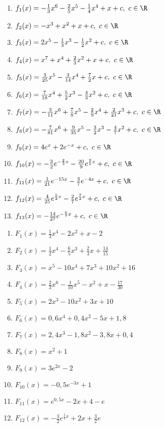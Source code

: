 \begin{Answer}[ref=stammfunktionenA2]
	\begin{enumerate}[label=\alph*)]
		\item \(f_1(x)=-\frac{1}{3}x^6-\frac{2}{5}x^5-\frac{1}{4}x^4+x+c,\ c\in\R\)
		\item \(f_2(x)=-x^3+x^2+x+c,\ c\in\R\)
		\item \(f_3(x)=2x^5-\frac{1}{3}x^3-\frac{1}{2}x^2+c,\ c\in\R\)
		\item \(f_4(x)=x^7+x^4+\frac{2}{3}x^2+x+c,\ c\in\R\)
		\item \(f_5(x)=\frac{3}{25}x^5-\frac{3}{14}x^4+\frac{7}{2}x+c,\ c\in\R\)
		\item \(f_6(x)=\frac{7}{18}x^4+\frac{5}{2}x^3-\frac{4}{3}x^2+c,\ c\in\R\)
		\item \(f_7(x)=-\frac{3}{11}x^6+\frac{7}{8}x^5-\frac{2}{9}x^4+\frac{2}{21}x^3+c,\ c\in\R\)
		\item \(f_8(x)=-\frac{7}{81}x^6+\frac{9}{35}x^5-\frac{3}{2}x^3-\frac{4}{7}x^2+c,\ c\in\R\)
		\item \(f_9(x)=4e^x+2e^{-x}+c,\ c\in\R\)
		\item \(f_{10}(x)=-\frac{3}{2}e^{-\frac{2}{3}x}-\frac{20}{9}e^{\frac{9}{5}x}+c,\ c\in\R\)
		\item \(f_{11}(x)=\frac{1}{21}e^{-15x}-\frac{3}{7}e^{-4x}+c,\ c\in\R\)
		\item \(f_{12}(x)=\frac{4}{25}e^{\frac{5}{2}x}-\frac{2}{7}e^{\frac{7}{2}x}+c,\ c\in\R\)
		\item \(f_{13}(x)=-\frac{14}{27}e^{-\frac{6}{7}x}+c,\ c\in\R\)
	\end{enumerate}
\end{Answer}
\begin{Answer}[ref=stammfunktionenA3]
	\begin{enumerate}[label=\alph*)]
		\item \(F_1(x)=\frac{1}{3}x^4-2x^2+x-2\)
		\item \(F_2(x)=\frac{1}{2}x^4-\frac{6}{5}x^3+\frac{2}{3}x+\frac{14}{15}\)
		\item \(F_3(x)=x^5-10x^4+7x^3+10x^2+16\)
		\item \(F_4(x)=\frac{2}{3}x^6-\frac{1}{10}x^5-x^2+x-\frac{17}{30}\)
		\item \(F_5(x)=2x^3-10x^2+3x+10\)
		\item \(F_6(x)=0,6x^4+0,4x^2-5x+1,8\)
		\item \(F_7(x)=2,4x^3-1,8x^2-3,8x+0,4\)
		\item \(F_8(x)=x^2+1\)
		\item \(F_9(x)=3e^{2x}-2\)%
		\item \(F_{10}(x)=-0,5e^{-3x}+1\)
		\item \(F_{11}(x)=e^{0,5x}-2x+4-e\)
		\item \(F_{12}(x)=-\frac{3}{2}e^{\frac{1}{4}x}+2x+\frac{3}{2}e\)
	\end{enumerate}
\end{Answer}